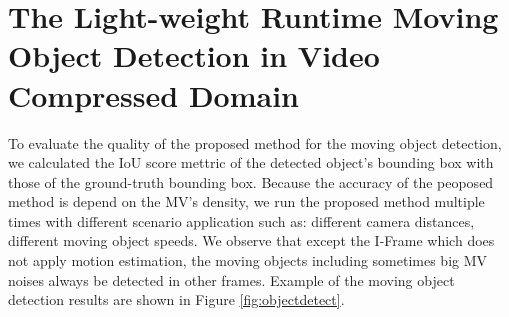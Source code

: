 \section{The Light-weight Runtime Moving Object Detection in Video Compressed Domain}
To evaluate the quality of the proposed method for the moving object detection, we calculated the IoU score mettric of the detected object's bounding box with those of the ground-truth bounding box. Because the accuracy of the peoposed method is depend on the MV's density, we run the proposed method multiple times with different scenario application such as: different camera distances, different moving object speeds. We observe that except the I-Frame which does not apply motion estimation, the moving objects including sometimes big MV noises always be detected in other frames. Example of the moving object detection results  are shown in Figure \ref{fig:objectdetect}. 
